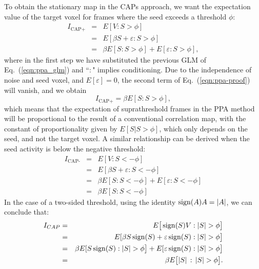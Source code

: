 To obtain the stationary map in the CAPs approach, we want the expectation value of the target voxel for frames where the seed exceeds a threshold $\phi$:
\begin{eqnarray}
  I_\text{CAP+} &=& E[V:S>\phi] \\
          &=& E[\beta S + \varepsilon : S>\phi] \\
          &=& \beta E[S : S>\phi] + E[\varepsilon  : S>\phi],    \label{eqn:ppa-proof}
\end{eqnarray}
where in the first step we have substituted the previous GLM of Eq.~(\ref{eqn:ppa_glm}) and ``$:$" implies conditioning.
Due to the independence of noise and seed voxel, and $E[\varepsilon]=0$, the second term of Eq.~(\ref{eqn:ppa-proof}) will vanish, and we obtain
\begin{equation}
 I_\text{CAP+} = \beta E[S : S > \phi],
\end{equation}
which means that the expectation of suprathreshold frames in the PPA method will be proportional to the result of a conventional correlation map, with the constant of proportionality given by $E[S|S > \phi]$, which only depends on the seed, and not the target voxel. A similar relationship can be derived when the seed activity is below the negative threshold: 
\begin{eqnarray}
  I_\text{CAP-} &=& E[V : S<-\phi] \\
          &=& E[\beta S + \varepsilon : S<-\phi] \\
          &=& \beta E[S : S<-\phi] + E[\varepsilon  : S<-\phi] \\
          &=& \beta E[S : S<-\phi]
\end{eqnarray}
In the case of a two-sided threshold, using the identity $\operatorname*{sign}(A)A = |A|$, we can conclude that: 
\begin{eqnarray}
  I_{CAP} &=& E\big[\sign(S)V : \left| S \right|>\phi\big] \\
   &=& E[\beta S\sign(S) + \varepsilon\sign(S) : \left| S \right|>\phi\big] \\
          &=& \beta E[S\sign(S)  : \left| S \right|>\phi\big] + E[\varepsilon \sign(S)  : \left| S \right|>\phi\big] \\
               &=& \beta E\big[|S|\, : \, \left|S \right| > \phi\big].
\end{eqnarray}



